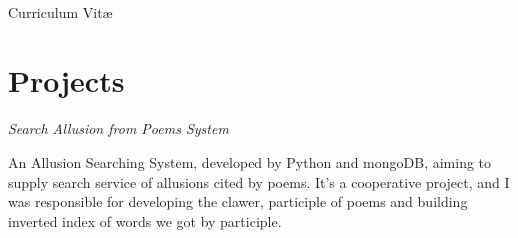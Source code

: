 \documentclass[10pt]{article} %
\begin{document}
\color{text1} %


\par{\\ %
{\color{headings} Curriculum {Vit\ae}\\[15pt]\par} %
	

\begin{minipage}[t]{0.52\textwidth} %
\vspace{0pt} %
	

\section{Projects} 


{\par}

{\raggedright\large \textit{Search Allusion from Poems System }\\[5pt]}

\normalsize{An Allusion Searching System, developed by Python and mongoDB, aiming to supply search service of allusions cited by poems. It's a cooperative project, and I was responsible for developing the clawer,  participle of poems and building inverted index of words we got by participle. }\\



\end{minipage}}
\end{document}

